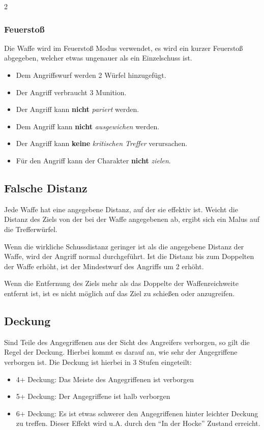 \begin{multicols}{2}
\begin{pexample}[Beispiel]
{\subsubsection{Feuerstoß}

Die Waffe wird im Feuerstoß Modus verwendet, es wird ein kurzer Feuerstoß abgegeben, welcher etwas ungenauer als ein Einzelschuss ist.
\begin{itemize}
    \item Dem Angriffswurf werden 2 Würfel hinzugefügt.
    \item Der Angriff verbraucht 3 Munition.
    \item Der Angriff kann \textbf{nicht} \textit{pariert} werden.
    \item Dem Angriff kann \textbf{nicht} \textit{ausgewichen} werden.
    \item Der Angriff kann \textbf{keine} \textit{kritischen Treffer} verursachen.
    \item Für den Angriff kann der Charakter \textbf{nicht} \textit{zielen}.
\end{itemize}
}

\subsection{Falsche Distanz}

Jede Waffe hat eine angegebene Distanz, auf der sie effektiv ist. Weicht die Distanz des Ziels von der bei der Waffe angegebenen ab, ergibt sich ein Malus auf die Trefferwürfel.

Wenn die wirkliche Schussdistanz geringer ist als die angegebene Distanz der Waffe, wird der Angriff normal durchgeführt. Ist die Distanz bis zum Doppelten der Waffe erhöht, ist der Mindestwurf des Angriffs um 2 erhöht.

Wenn die Entfernung des Ziels mehr als das Doppelte der Waffenreichweite entfernt ist, ist es nicht möglich auf das Ziel zu schießen oder anzugreifen.

\subsection{Deckung}

Sind Teile des Angegriffenen aus der Sicht des Angreifers verborgen, so gilt die Regel der Deckung. Hierbei kommt es darauf an, wie sehr der Angegriffene verborgen ist. Die Deckung ist hierbei in 3 Stufen eingeteilt:
\begin{itemize}
    \item 4+ Deckung: Das Meiste des Angegriffenen ist verborgen
    \item 5+ Deckung: Der Angegriffene ist halb verborgen
    \item 6+ Deckung: Es ist etwas schwerer den Angegriffenen hinter leichter Deckung zu treffen. Dieser Effekt wird u.A. durch den ``In der Hocke'' Zustand erreicht.
\end{itemize}


\end{pexample}
\end{multicols}
